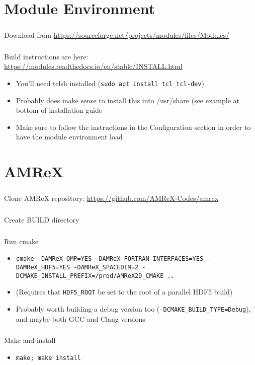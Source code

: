 \documentclass[a4paper,10pt]{report}
\begin{document}
\chapter{Module Environment}
\paragraph{} Download from \url{https://sourceforge.net/projects/modules/files/Modules/}
\paragraph{} Build instructions are here: \url{https://modules.readthedocs.io/en/stable/INSTALL.html}
\begin{itemize}
    \item You’ll need tclsh installed (\verb|sudo apt install tcl tcl-dev|)
    \item Probably does make sense to install this into /usr/share (see example at bottom of installation guide
    \item Make sure to follow the instructions in the Configuration section in order to have the module environment load
\end{itemize}

\chapter{AMReX}
\paragraph{} Clone AMReX repository: \url{https://github.com/AMReX-Codes/amrex}
\paragraph{} Create BUILD directory
\paragraph{} Run cmake
\begin{itemize}
    \item 
    \begin{lstlisting}
cmake -DAMReX_OMP=YES -DAMReX_FORTRAN_INTERFACES=YES -DAMReX_HDF5=YES -DAMReX_SPACEDIM=2 -DCMAKE_INSTALL_PREFIX=/prod/AMReX2D_CMAKE ..
    \end{lstlisting}
    \item (Requires that \verb|HDF5_ROOT| be set to the root of a parallel HDF5 build)
    \item Probably worth building a debug version too (\verb|-DCMAKE_BUILD_TYPE=Debug|), and maybe both GCC and Clang versions
\end{itemize}


\paragraph{} Make and install
\begin{itemize}
    \item \verb|make; make install|
\end{itemize}
\end{document}
